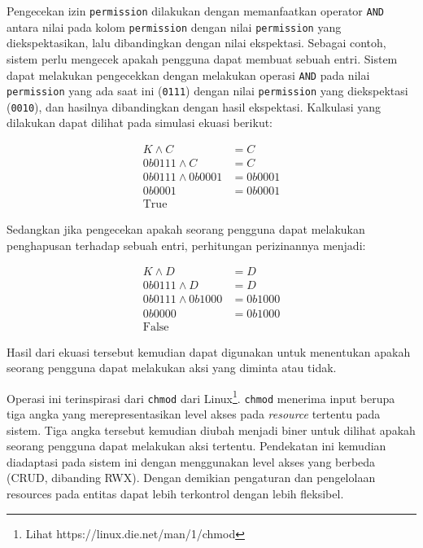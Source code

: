     Pengecekan izin \texttt{permission} dilakukan dengan memanfaatkan operator
    \texttt{AND} antara nilai pada kolom \texttt{permission} dengan nilai
    \texttt{permission} yang diekspektasikan, lalu dibandingkan dengan nilai
    ekspektasi. Sebagai contoh, sistem perlu mengecek apakah pengguna dapat
    membuat sebuah entri. Sistem dapat melakukan pengecekkan dengan melakukan
    operasi \texttt{AND} pada nilai \texttt{permission} yang ada saat ini
    (\texttt{0111}) dengan nilai \texttt{permission} yang diekspektasi
    (\texttt{0010}), dan hasilnya dibandingkan dengan hasil ekspektasi.
    Kalkulasi yang dilakukan dapat dilihat pada simulasi ekuasi berikut:
    
    \begin{subequations}
        \begin{align}
            K \wedge C &= C \\
            0b0111 \wedge C &= C \\
            0b0111 \wedge 0b0001 &= 0b0001 \\
            0b0001 &= 0b0001 \\
            \text{True}
        \end{align}
    \end{subequations}
    
    Sedangkan jika pengecekan apakah seorang pengguna dapat melakukan
    penghapusan terhadap sebuah entri, perhitungan perizinannya menjadi:
    
    \begin{subequations}
        \begin{align}
            K \wedge D &= D \\
            0b0111 \wedge D &= D \\
            0b0111 \wedge 0b1000 &= 0b1000 \\
            0b0000 &= 0b1000 \\
            \text{False}
        \end{align}
    \end{subequations}
    
    Hasil dari ekuasi tersebut kemudian dapat digunakan untuk menentukan apakah
    seorang pengguna dapat melakukan aksi yang diminta atau tidak.
    
    Operasi ini terinspirasi dari \texttt{chmod} dari Linux\footnote{Lihat
    https://linux.die.net/man/1/chmod}. \texttt{chmod} menerima input berupa
    tiga angka yang merepresentasikan level akses pada \textit{resource}
    tertentu pada sistem. Tiga angka tersebut kemudian diubah menjadi biner
    untuk dilihat apakah seorang pengguna dapat melakukan aksi tertentu.
    Pendekatan ini kemudian diadaptasi pada sistem ini dengan menggunakan level
    akses yang berbeda (CRUD, dibanding RWX). Dengan demikian pengaturan dan
    pengelolaan resources pada entitas dapat lebih terkontrol dengan lebih
    fleksibel.
    
